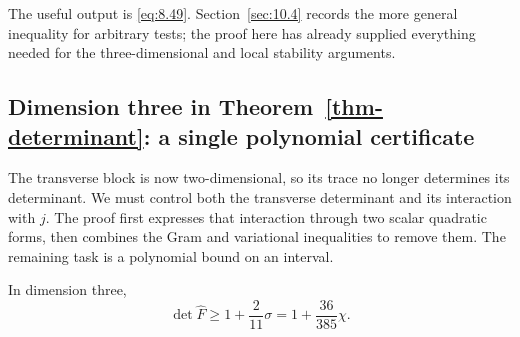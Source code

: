 The useful output is \eqref{eq:8.49}. Section~\ref{sec:10.4} records the more general inequality
for arbitrary tests; the proof here has already supplied everything needed
for the three-dimensional and local stability arguments.

\subsection{Dimension three in Theorem~\ref{thm-determinant}: a single polynomial certificate}\label{sec:8.5}

The transverse block is now two-dimensional, so its trace no longer determines
its determinant. We must control both the transverse determinant and its
interaction with $j$. The proof first expresses that interaction through two
scalar quadratic forms, then combines the Gram and variational inequalities
to remove them. The remaining task is a polynomial bound on an interval.

\begin{proposition}\label{prop-dim3}
In dimension three,
\begin{equation}\label{eq:8.55}
\det\widehat F\ge1+\frac2{11}\sigma
=1+\frac{36}{385}\chi.
\end{equation}

\end{proposition}

